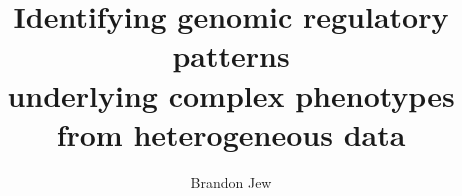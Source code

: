 \documentclass [PhD] {uclathes}
\title          {Identifying genomic regulatory patterns \\
                 underlying complex phenotypes from heterogeneous data}
\author         {Brandon Jew}
\begin{document}
\makeintropages

%
%








 \typeout{}


\end{document}
